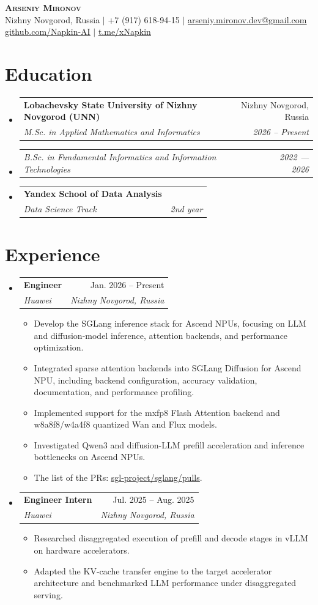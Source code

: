 \documentclass[letterpaper,10pt]{article}
\makeatletter
\newcommand{\resumeItem}[1]{\item\small{#1\vspace{-1pt}}}
\newcommand{\resumeSubheading}[4]{
  \vspace{0pt}\item
  \begin{tabular*}{0.98\textwidth}[t]{l@{\extracolsep{\fill}}r}
    \textbf{#1} & #2 \\
    \textit{\small #3} & \textit{\small #4} \\
  \end{tabular*}\vspace{-6pt}
}
\newcommand{\resumeSubSubheading}[2]{
  \item
  \begin{tabular*}{0.98\textwidth}{l@{\extracolsep{\fill}}r}
    \textit{\small #1} & \textit{\small #2} \\
  \end{tabular*}\vspace{-6pt}
}
\newcommand{\resumeSubHeadingListStart}{\begin{itemize}[leftmargin=0.14in,label={}]}
\newcommand{\resumeSubHeadingListEnd}{\end{itemize}}
\newcommand{\resumeItemListStart}{\begin{itemize}[leftmargin=0.22in,itemsep=1pt,topsep=2pt]}
\newcommand{\resumeItemListEnd}{\end{itemize}\vspace{-5pt}}
\makeatother
\begin{document}
\begin{center}
  \textbf{\Huge \scshape Arseniy Mironov} \\ \vspace{2pt}
  \small Nizhny Novgorod, Russia $|$ +7 (917) 618-94-15 $|$
  \href{mailto:arseniy.mironov.dev@gmail.com}{\underline{arseniy.mironov.dev@gmail.com}} \\
  \href{https://github.com/Napkin-AI}{\underline{github.com/Napkin-AI}} $|$
  \href{https://t.me/xNapkin}{\underline{t.me/xNapkin}}
\end{center}

\section{Education}
\resumeSubHeadingListStart
  \resumeSubheading
    {Lobachevsky State University of Nizhny Novgorod (UNN)}{Nizhny Novgorod, Russia}
    {M.Sc. in Applied Mathematics and Informatics}{2026 -- Present}
  \resumeSubSubheading
    {B.Sc. in Fundamental Informatics and Information Technologies}{2022 --- 2026}
  \resumeSubheading
    {Yandex School of Data Analysis}{ }
    {Data Science Track}{2nd year}
\resumeSubHeadingListEnd

\section{Experience}
\resumeSubHeadingListStart
  \resumeSubheading
    {Engineer}{Jan. 2026 -- Present}
    {Huawei}{Nizhny Novgorod, Russia}
  \resumeItemListStart
    \resumeItem{Develop the SGLang inference stack for Ascend NPUs, focusing on LLM and diffusion-model inference, attention backends, and performance optimization.}
    \resumeItem{Integrated sparse attention backends into SGLang Diffusion for Ascend NPU, including backend configuration, accuracy validation, documentation, and performance profiling.}
    \resumeItem{Implemented support for the mxfp8 Flash Attention backend and w8a8f8/w4a4f8 quantized Wan and Flux models.}
    \resumeItem{Investigated Qwen3 and diffusion-LLM prefill acceleration and inference bottlenecks on Ascend NPUs.}
    \resumeItem{The list of the PRs: \href{https://github.com/sgl-project/sglang/pulls?q=is\%3Apr+state\%3Aclosed+author\%3ANapkin-AI}{\underline{sgl-project/sglang/pulls}}.}
  \resumeItemListEnd

  \resumeSubheading
    {Engineer Intern}{Jul. 2025 -- Aug. 2025}
    {Huawei}{Nizhny Novgorod, Russia}
  \resumeItemListStart
    \resumeItem{Researched disaggregated execution of prefill and decode stages in vLLM on hardware accelerators.}
    \resumeItem{Adapted the KV-cache transfer engine to the target accelerator architecture and benchmarked LLM performance under disaggregated serving.}
  \resumeItemListEnd
\resumeSubHeadingListEnd
\end{document}
